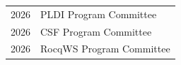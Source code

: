 \begin{tabular}{l l}
  2026 & PLDI Program Committee \\
  2026 & CSF Program Committee \\
  2026 & RocqWS Program Committee \\
\end{tabular}

